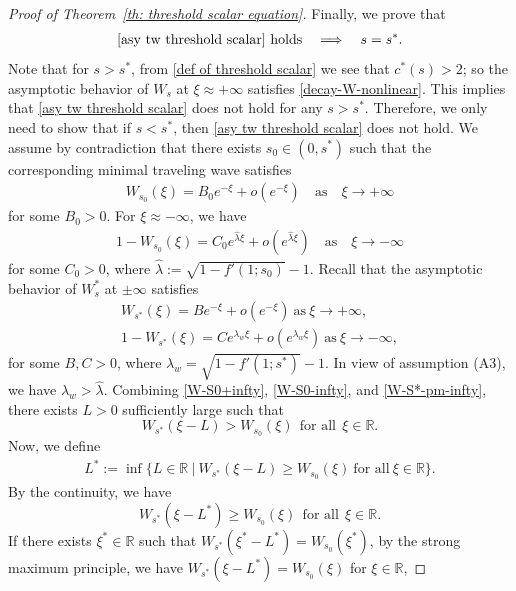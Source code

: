 \documentclass[11pt,a4paper]{article}
\numberwithin{equation}{section}
\numberwithin{figure}{section}
\newcommand\bea{\begin{eqnarray}}
\newcommand\eea{\end{eqnarray}}
\newcommand\beaa{\begin{eqnarray*}}
\newcommand\eeaa{\end{eqnarray*}}
\begin{document}
\begin{proof}[Proof of Theorem~\ref{th: threshold scalar equation}]

Finally, we prove that
\bea\label{th1:goal-2}
\mbox{\eqref{asy tw threshold scalar} holds} \quad \Longrightarrow \quad s=s^*.
\eea
Note that for $s>s^*$, from \eqref{def of threshold scalar} we see that $c^{*}(s)>2$; so the asymptotic behavior of $W_s$ at $\xi\approx+\infty$ satisfies \eqref{decay-W-nonlinear}. This implies that
\eqref{asy tw threshold scalar} does not hold for any $s>s^*$. Therefore,
we only need to show that if $s<s^*$, then \eqref{asy tw threshold scalar} does not hold.
We assume by contradiction that there exists $s_0\in(0,s^*)$ such that
the corresponding minimal traveling wave satisfies
\bea\label{W-S0+infty}
W_{s_0}(\xi)=B_0 e^{-\xi}+o(e^{-\xi})\quad\text{as}\quad \xi\to+\infty
\eea
for some $B_0>0$. For $\xi\approx -\infty$, we have
\bea\label{W-S0-infty}
1-W_{s_0}(\xi)=C_0 e^{\hat\lambda\xi}+o(e^{\hat\lambda\xi})\quad\text{as}\quad \xi\to-\infty
\eea
for some $C_0>0$, where $\hat\lambda:=\sqrt{1-f'(1;s_0)}-1$.
Recall that the asymptotic behavior of $W_s^*$ at $\pm\infty$ satisfies
\begin{equation}\label{W-S*-pm-infty}
\begin{aligned}
W_{s^*}(\xi)=B e^{-\xi}+o(e^{-\xi})\ \text{as}\ \xi\to+\infty,\\
1-W_{s^*}(\xi)=C e^{\lambda_w\xi}+o(e^{\lambda_w\xi})\ \text{as}\ \xi\to-\infty,
\end{aligned}
\end{equation}
for some $B,C>0$, where $\lambda_w=\sqrt{1-f'(1;s^*)}-1$. In view of assumption (A3), we have $\lambda_w> \hat\lambda$.
Combining \eqref{W-S0+infty}, \eqref{W-S0-infty}, and \eqref{W-S*-pm-infty}, there exists $L>0$ sufficiently large such that
$$W_{s^*}(\xi-L)> W_{s_0}(\xi)\ \ \text{for all}\ \ \xi\in\mathbb{R}.$$
Now, we define
\beaa
L^*:=\inf\{L\in\mathbb{R}\ |\ W_{s^*}(\xi-L)\ge W_{s_0}(\xi)\ \text{for all}\ \xi\in\mathbb{R}\}.
\eeaa
By the continuity, we have 
$$W_{s^*}(\xi-L^*)\geq W_{s_0}(\xi)\ \ \text{for all}\ \ \xi\in\mathbb{R}.$$
 If there exists $\xi^*\in\mathbb{R}$ such that
$W_{s^*}(\xi^*-L^*)= W_{s_0}(\xi^*)$, by the strong maximum principle, we have $W_{s^*}(\xi-L^*)=W_{s_0}(\xi)$ for $\xi\in\mathbb{R}$,

\end{proof}
\end{document}
